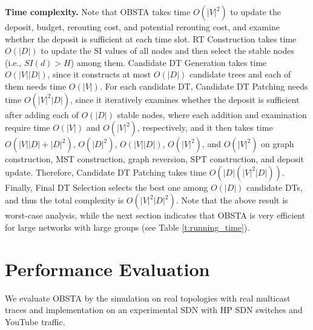 \documentclass[10pt, conference, letterpaper]{IEEEtran}
\theoremstyle{definition}
\begin{document}
\noindent\textbf{Time complexity.}
Note that OBSTA takes time $O(|V|^2)$ to update the deposit, budget, rerouting cost, and potential rerouting cost, and examine whether the deposit is sufficient at each time slot. RT Construction takes time $O(|D|)$ to update the SI values of all nodes and then select the stable nodes (i.e., $SI(d)>H$) among them. Candidate DT Generation takes time $O(|V||D|)$, since it constructs at most $O(|D|)$ candidate trees and each of them needs time $O(|V|)$. For each candidate DT, Candidate DT Patching needs time {\color{black}$O(|V|^2|D|)$}, since it iteratively examines whether the deposit is sufficient after adding each of $O(|D|)$ stable nodes, where each addition and examination require time $O(|V|)$ and $O(|V|^2)$, respectively, and it then takes time $O(|V||D|+|D|^2)$, {\color{black}$O(|D|^2)$}, $O(|V||D|)$, $O(|V|^2)$, and $O(|V|^2)$ on graph construction, MST construction, graph reversion, SPT construction, and deposit update. Therefore, Candidate DT Patching takes time {\color{black}$O(|D|(|V|^2|D|))$}. Finally, Final DT Selection selects the best one among $O(|D|)$ candidate DTs, and thus the total complexity is {\color{black}$O(|V|^2|D|^2)$}. Note that the above result is worst-case analysis, while the next section indicates that OBSTA is very efficient for large networks with large groups (see Table \ref{t:running_time}).

\section{Performance Evaluation}\label{sec: evaluation}
We evaluate OBSTA by the simulation on real topologies with real multicast traces and implementation on an experimental SDN with HP SDN switches and YouTube traffic.
\end{document}
